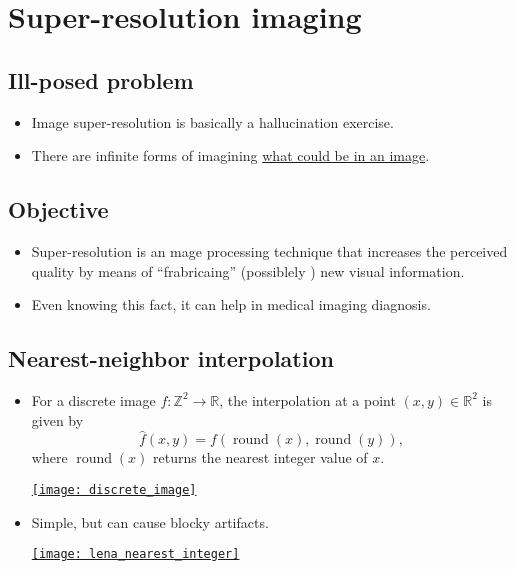 \chapter{Super-resolution imaging}

\section{Ill-posed problem}
\begin{itemize}
\item Image super-resolution is basically a hallucination exercise.
\item There are infinite forms of imagining
  \href{https://en.wikipedia.org/wiki/Super-resolution_imaging}{what
    could be in an image}.
\end{itemize}

\section{Objective}
\begin{itemize}
\item Super-resolution is an mage processing technique that
  increases the perceived quality by means of ``frabricaing''
  (possiblely ) new visual information.
\item Even knowing this fact, it can help in medical imaging
  diagnosis.
\end{itemize}

\section{Nearest-neighbor interpolation}
\begin{itemize}
\item For a discrete image $f: \mathbb{Z}^2 \to \mathbb{R}$, the interpolation at a point 
$(x,y) \in \mathbb{R}^2$ is given by
\begin{equation}
\hat{f}(x,y) = f\!\left( \operatorname{round}(x), \operatorname{round}(y) \right),
\end{equation}
where $\operatorname{round}(x)$ returns the nearest integer value of $x$. 
\vspace{-2.5ex}
\begin{center}
  \href{https://www.mrecacademics.com/DepartmentStudyMaterials/20201220-Digital%20Image%20Processing%20Notes.pdf}{\texttt{[image: discrete\_image]}}
\end{center}
\item Simple, but can cause blocky artifacts.
\begin{center}
  \href{https://github.com/vicente-gonzalez-ruiz/medical_imaging/blob/main/notebooks/nearest_integer_interpolation.ipynb}{\texttt{[image: lena\_nearest\_integer]}}
\end{center}
\end{itemize}

